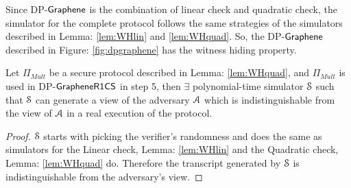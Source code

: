 Since DP-$\textsf{Graphene}$ is the combination of linear check and quadratic check, the simulator for the complete protocol follows the same strategies of the simulators described in Lemma: \ref{lem:WHlin} and \ref{lem:WHquad}. So, the DP-$\textsf{Graphene}$ described in Figure: \ref{fig:dpgraphene} has the witness hiding property.

\begin{lemma}
	Let $\Pi_{Mult}$ be a secure protocol described in Lemma: \ref{lem:WHquad}, and $\Pi_{Mult}$ is used in DP-$\mathsf{GrapheneR1CS}$ in step 5, then $\exists$ polynomial-time simulator $\mathcal{S}$ such that $\mathcal{S}$ can generate a view of the adversary $\mathcal{A}$ which is indistinguishable from the view of $\mathcal{A}$ in a real execution of the protocol.
\end{lemma}

\begin{proof}
	$\mathcal{S}$ starts with picking the verifier's randomness and does the same as simulators for the Linear check, Lemma: \ref{lem:WHlin} and the Quadratic check, Lemma: \ref{lem:WHquad} do. Therefore the transcript generated by $\mathcal{S}$ is indistinguishable from the adversary's view.
\end{proof}
